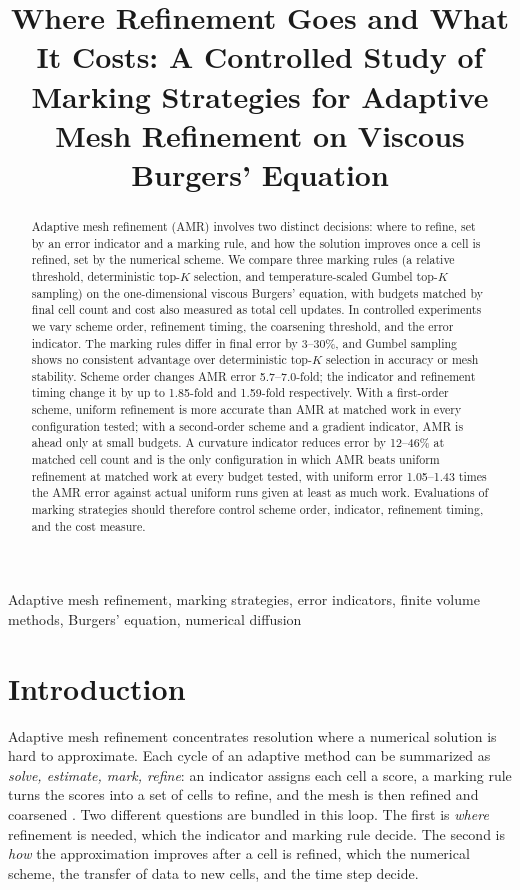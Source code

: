 \documentclass[conference]{IEEEtran}
\title{Where Refinement Goes and What It Costs: A Controlled Study of Marking Strategies for Adaptive Mesh Refinement on Viscous Burgers' Equation}
\author{
\IEEEauthorblockN{Achyuta Rag}
\IEEEauthorblockA{
\textcolor{red}{[Department]}, University of California, Irvine\\
Irvine, CA, USA\\
achyutr@uci.edu
}
}
\begin{document}
\maketitle

\begin{abstract}
Adaptive mesh refinement (AMR) involves two distinct decisions: where to refine, set by an error indicator and a marking rule, and how the solution improves once a cell is refined, set by the numerical scheme. We compare three marking rules (a relative threshold, deterministic top-$K$ selection, and temperature-scaled Gumbel top-$K$ sampling) on the one-dimensional viscous Burgers' equation, with budgets matched by final cell count and cost also measured as total cell updates. In controlled experiments we vary scheme order, refinement timing, the coarsening threshold, and the error indicator. The marking rules differ in final error by 3--30\%, and Gumbel sampling shows no consistent advantage over deterministic top-$K$ selection in accuracy or mesh stability. Scheme order changes AMR error 5.7--7.0-fold; the indicator and refinement timing change it by up to 1.85-fold and 1.59-fold respectively. With a first-order scheme, uniform refinement is more accurate than AMR at matched work in every configuration tested; with a second-order scheme and a gradient indicator, AMR is ahead only at small budgets. A curvature indicator reduces error by 12--46\% at matched cell count and is the only configuration in which AMR beats uniform refinement at matched work at every budget tested, with uniform error 1.05--1.43 times the AMR error against actual uniform runs given at least as much work. Evaluations of marking strategies should therefore control scheme order, indicator, refinement timing, and the cost measure.
\end{abstract}

\begin{IEEEkeywords}
Adaptive mesh refinement, marking strategies, error indicators, finite volume methods, Burgers' equation, numerical diffusion
\end{IEEEkeywords}

\section{Introduction}

Adaptive mesh refinement concentrates resolution where a numerical solution is hard to approximate. Each cycle of an adaptive method can be summarized as \emph{solve, estimate, mark, refine}: an indicator assigns each cell a score, a marking rule turns the scores into a set of cells to refine, and the mesh is then refined and coarsened \cite{berger1984,berger1989}. Two different questions are bundled in this loop. The first is \emph{where} refinement is needed, which the indicator and marking rule decide. The second is \emph{how} the approximation improves after a cell is refined, which the numerical scheme, the transfer of data to new cells, and the time step decide.
\end{document}

